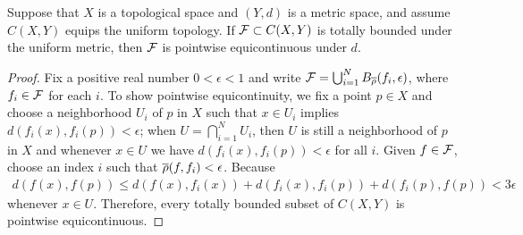 \begin{lem}\label{families of totally bounded continuous maps are equicontinuous}
    Suppose that $X$ is a topological space and $(Y, d)$ is a metric space, and assume $C(X, Y)$ equips the uniform topology.
    If ${\mathcal{F}}\subset C(X, Y)$ is totally bounded under the uniform metric, then ${\mathcal{F}}$ is pointwise equicontinuous under $d$.
\end{lem}
\begin{proof}
    Fix a positive real number $0<\epsilon<1$ and write ${\mathcal{F}}=\bigcup_{i=1}^N B_{\overline{\rho}}(f_i, \epsilon)$, where $f_i\in{\mathcal{F}}$ for each $i$.
    To show pointwise equicontinuity, we fix a point $p\in X$ and choose a neighborhood $U_i$ of $p$ in $X$ such that $x\in U_i$ implies $d(f_i(x), f_i(p))<\epsilon$; when $U=\bigcap_{i=1}^N U_i$, then $U$ is still a neighborhood of $p$ in $X$ and whenever $x\in U$ we have $d(f_i(x), f_i(p))<\epsilon$ for all $i$.
    Given $f\in{\mathcal{F}}$, choose an index $i$ such that $\overline{\rho}(f, f_i)<\epsilon$.
    Because
    \begin{align*}
        d(f(x), f(p))\leq d(f(x), f_i(x))+d(f_i(x), f_i(p))+d(f_i(p), f(p))<3\epsilon
    \end{align*}
    whenever $x\in U$.
    Therefore, every totally bounded subset of $C(X, Y)$ is pointwise equicontinuous.
\end{proof}

